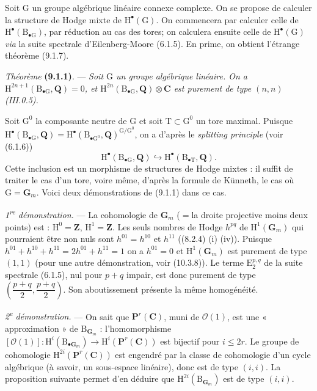\documentclass[11pt,leqno]{article}
\begin{document}
Soit \(\mathrm{G}\) un groupe algébrique linéaire connexe complexe. On se propose de calculer la structure de Hodge mixte de \(\mathrm{H}^{\bullet}(\mathrm{G})\). On commencera par calculer celle de \(\mathrm{H}^{\bullet}(\mathrm{B}_{\bullet\mathrm{G}})\), par réduction au cas des tores; on calculera ensuite celle de \(\mathrm{H}^{\bullet}(\mathrm{G})\) \textit{via} la suite spectrale d’Eilenberg-Moore (6.1.5). En prime, on obtient l’étrange théorème (9.1.7).

\textit{Théorème} \textbf{(9.1.1)}. — \textit{Soit \(\mathrm{G}\) un groupe algébrique linéaire. On a \(\mathrm{H}^{2n+1}(\mathrm{B}_{\bullet\mathrm{G}},\mathbf{Q})=0\), et \(\mathrm{H}^{2n}(\mathrm{B}_{\bullet\mathrm{G}},\mathbf{Q})\otimes\mathbf{C}\) est purement de type \((n,n)\) \textup{(III.0.5)}.}

Soit \(\mathrm{G}^{0}\) la composante neutre de \(\mathrm{G}\) et soit \(\mathrm{T}\subset\mathrm{G}^{0}\) un tore maximal. Puisque \(\mathrm{H}^{\bullet}(\mathrm{B}_{\bullet\mathrm{G}},\mathbf{Q})=\mathrm{H}^{\bullet}(\mathrm{B}_{\bullet\mathrm{G}^{0}},\mathbf{Q})^{\mathrm{G}/\mathrm{G}^{0}}\), on a d’après le \textit{splitting principle} (voir (6.1.6))
\[
\mathrm{H}^{\bullet}(\mathrm{B}_{\bullet\mathrm{G}},\mathbf{Q})
\hookrightarrow
\mathrm{H}^{\bullet}(\mathrm{B}_{\bullet\mathrm{T}},\mathbf{Q}).
\]
Cette inclusion est un morphisme de structures de Hodge mixtes : il suffit de traiter le cas d’un tore, voire même, d’après la formule de Künneth, le cas où \(\mathrm{G}=\mathbf{G}_{m}\). Voici deux démonstrations de (9.1.1) dans ce cas.

\textit{1\textsuperscript{re} démonstration.} — La cohomologie de \(\mathbf{G}_{m}\) (\(=\)la droite projective moins deux points) est : \(\mathrm{H}^{0}=\mathbf{Z}\), \(\mathrm{H}^{1}=\mathbf{Z}\). Les seuls nombres de Hodge \(h^{pq}\) de \(\mathrm{H}^{1}(\mathbf{G}_{m})\) qui pourraient être non nuls sont \(h^{01}=h^{10}\) et \(h^{11}\) ((8.2.4) (i) (iv)). Puisque \(h^{01}+h^{10}+h^{11}=2h^{01}+h^{11}=1\) on a \(h^{01}=0\) et \(\mathrm{H}^{1}(\mathbf{G}_{m})\) est purement de type \((1,1)\) (pour une autre démonstration, voir (10.3.8)). Le terme \(\mathrm{E}_{2}^{p,q}\) de la suite spectrale (6.1.5), nul pour \(p+q\) impair, est donc purement de type \(\left(\dfrac{p+q}{2},\dfrac{p+q}{2}\right)\). Son aboutissement présente la même homogénéité.

\textit{2\textsuperscript{e} démonstration.} — On sait que \(\mathbf{P}^{r}(\mathbf{C})\), muni de \(\mathscr{O}(1)\), est une « approximation » de \(\mathrm{B}_{\mathbf{G}_{m}}\) : l’homomorphisme \([\mathscr{O}(1)]:\mathrm{H}^{i}(\mathrm{B}_{\bullet\mathbf{G}_{m}})\to\mathrm{H}^{i}(\mathbf{P}^{r}(\mathbf{C}))\) est bijectif pour \(i\leq2r\). Le groupe de cohomologie \(\mathrm{H}^{2i}(\mathbf{P}^{r}(\mathbf{C}))\) est engendré par la classe de cohomologie d’un cycle algébrique (à savoir, un sous-espace linéaire), donc est de type \((i,i)\). La proposition suivante permet d’en déduire que \(\mathrm{H}^{2i}(\mathrm{B}_{\mathbf{G}_{m}})\) est de type \((i,i)\).
\end{document}

